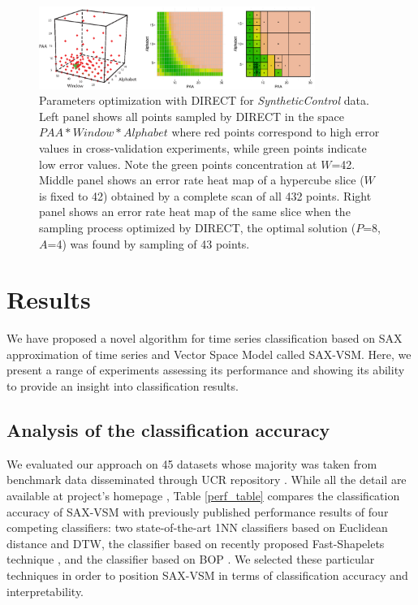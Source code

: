 \documentclass[conference]{IEEEtran}
\begin{document}
\begin{figure}[t]
   \centering
   \vspace{-0.2cm}
   \includegraphics[width=90mm]{figures/figure_direct.eps}
   \caption{Parameters optimization with DIRECT for \textit{SyntheticControl} data. 
   Left panel shows all points sampled by DIRECT in the space $PAA*Window*Alphabet$ where
   red points correspond to high error values in cross-validation experiments, 
   while green points indicate low error values. 
   Note the green points concentration at $W$=42. 
   Middle panel shows an error rate heat map of a hypercube slice ($W$ is fixed to 42)
   obtained by a complete scan of all 432 points. 
   Right panel shows an error rate heat map of the same slice when 
   the sampling process optimized by DIRECT, 
   the optimal solution ($P$=8,$A$=4) was found by sampling of 43 points.}
   \vspace{-0.1cm}
   \label{fig:direct-sampling}
\end{figure}

\section{Results} \label{results}
We have proposed a novel algorithm for time series classification based on SAX
approximation of time series and Vector Space Model called SAX-VSM. 
Here, we present a range of experiments assessing its performance and showing
its ability to provide an insight into classification results.

\subsection{Analysis of the classification accuracy}
We evaluated our approach on 45 datasets whose majority was taken from benchmark 
data disseminated through UCR repository \cite{ucr}. While all the detail are available at 
project's homepage \cite{jmotif}, Table \ref{perf_table} compares the classification accuracy 
of SAX-VSM with previously published performance results of four competing classifiers: 
two state-of-the-art 1NN classifiers based on Euclidean distance and DTW, 
the classifier based on recently proposed Fast-Shapelets technique \cite{fast-shapelets}, 
and the classifier based on BOP \cite{bag_patterns}.
We selected these particular techniques in order to position SAX-VSM in terms of 
classification accuracy and interpretability. 
\end{document}
